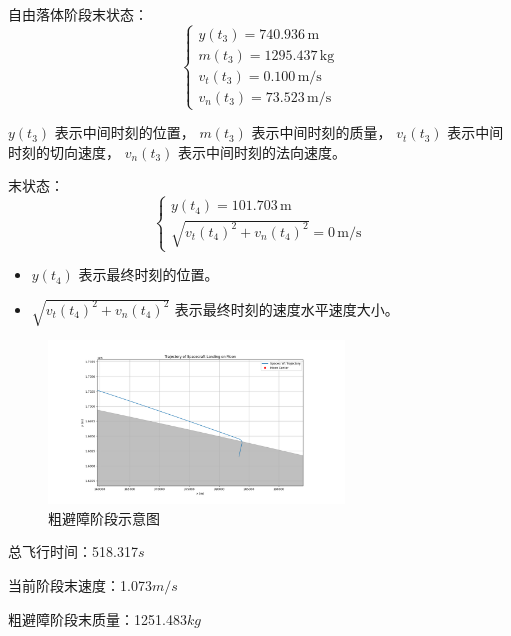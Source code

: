 \documentclass{ctexart}
\begin{document}
自由落体阶段末状态：
\begin{equation}
\begin{cases}
y(t_3) = 740.936 \, \text{m} \\
m(t_3) = 1295.437 \, \text{kg} \\
v_t(t_3) = 0.100 \, \text{m/s} \\
v_n(t_3) = 73.523 \, \text{m/s}
\end{cases}
\end{equation}


$y(t_3)$ 表示中间时刻的位置，
$m(t_3)$ 表示中间时刻的质量，
$v_t(t_3)$ 表示中间时刻的切向速度，
$v_n(t_3)$ 表示中间时刻的法向速度。

末状态：
\begin{equation}
\begin{cases}
y(t_4) = 101.703 \, \text{m} \\
\sqrt{v_t(t_4)^2 + v_n(t_4)^2} = 0 \, \text{m/s}
\end{cases}
\end{equation}

\begin{itemize}
\item $y(t_4)$ 表示最终时刻的位置。
\item $\sqrt{v_t(t_4)^2 + v_n(t_4)^2}$ 表示最终时刻的速度水平速度大小。
\end{itemize}

    \begin{figure}[H] %
        \centering %
        \includegraphics[width=0.7\textwidth]{"./picture/stage3_2.png"} %
        \caption{粗避障阶段示意图} %
        \label{fig:example} %
    \end{figure}

总飞行时间：518.317\(s\)

当前阶段末速度：1.073\(m/s\)

粗避障阶段末质量：1251.483\(kg\)
\end{document}
